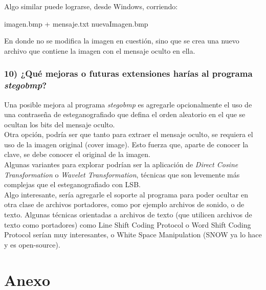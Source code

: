 \documentclass[a4paper,10pt]{article}
\begin{document}
Algo similar puede lograrse, desde Windows, corriendo:
\begin{center}
    imagen.bmp + mensaje.txt nuevaImagen.bmp
\end{center}

En donde no se modifica la imagen en cuestión, sino que se crea una nuevo archivo que contiene la imagen con el mensaje oculto en ella.

\subsubsection*{ 10) ¿Qué mejoras o futuras extensiones harías al programa \textit{stegobmp}?}

Una posible mejora al programa \textit{stegobmp} es agregarle opcionalmente el uso de una contraseña de esteganografiado que defina el orden aleatorio en el que
se ocultan los bits del mensaje oculto. \\

Otra opción, podría ser que tanto para extraer el mensaje oculto, se requiera el uso de la imagen original (cover image). Esto fuerza que, aparte de conocer la clave, 
se debe conocer el original de la imagen.\\

Algunas variantes para explorar podrían ser la aplicación de \textit{Direct Cosine Transformation} o \textit{Wavelet Transformation}, técnicas que son levemente más complejas 
que el esteganografiado con LSB.\\

Algo interesante, sería agregarle el soporte al programa para poder ocultar en otra clase de archivos portadores, como por ejemplo archivos de sonido, o de texto. Algunas
técnicas orientadas a archivos de texto (que utilicen archivos de texto como portadores) como Line Shift Coding Protocol o Word Shift Coding Protocol serían 
muy interesantes, o White Space Manipulation (SNOW ya lo hace y es open-source).

\clearpage
\appendix
\section{Anexo}
\end{document}
